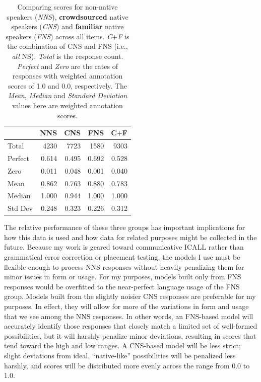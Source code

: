 \begin{table}[htb!]
\begin{center}
\begin{tabular}{|l||r||r|r||r|}
\hline
 & NNS	& CNS & FNS & C$+$F \\
\hline
\hline
Total & 4230 & 7723 & 1580 & 9303 \\
\hline
\hline
Perfect & 0.614 & 0.495 & 0.692 & 0.528 \\
\hline
Zero & 0.011 & 0.048 & 0.001 & 0.040 \\
\hline
\hline
Mean & 0.862 & 0.763 & 0.880 & 0.783 \\
\hline
Median & 1.000 & 0.944 & 1.000 & 1.000 \\
\hline
Std Dev & 0.248 & 0.323 & 0.226 & 0.312 \\
\hline
\end{tabular}
\caption{\label{tab:was1} Comparing scores for non-native speakers (\textit{NNS}), \textbf{crowdsourced} native speakers (\textit{CNS}) and \textbf{familiar} native speakers (\textit{FNS}) across all items. \textit{C$+$F} is the combination of CNS and FNS (i.e., \textit{all} NS). \textit{Total} is the response count. \textit{Perfect} and \textit{Zero} are the rates of responses with weighted annotation scores of 1.0 and 0.0, respectively. The \textit{Mean}, \textit{Median} and \textit{Standard Deviation} values here are weighted annotation scores.}
\end{center}
\end{table}

The relative performance of these three groups has important implications for how this data is used and how data for related purposes might be collected in the future. Because my work is geared toward communicative ICALL rather than grammatical error correction or placement testing, the models I use must be flexible enough to process NNS responses without heavily penalizing them for minor issues in form or usage. For my purposes, models built only from FNS responses would be overfitted to the near-perfect language usage of the FNS group. Models built from the slightly noisier CNS responses are preferable for my purposes. In effect, they will allow for more of the variations in form and usage that we see among the NNS responses. In other words, an FNS-based model will accurately identify those responses that closely match a limited set of well-formed possibilities, but it will harshly penalize minor deviations, resulting in scores that tend toward the high and low ranges. A CNS-based model will be less strict; slight deviations from ideal, ``native-like'' possibilities will be penalized less harshly, and scores will be distributed more evenly across the range from 0.0 to 1.0.


